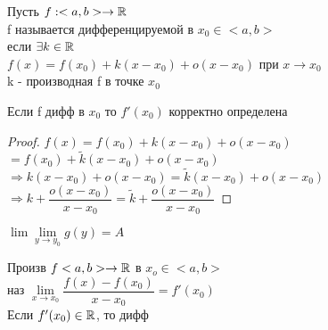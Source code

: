 
\begin{definition}
	Пусть $ f : <a, b> \rightarrow \mathbb{R} $ \\
	f называется дифференцируемой в $ x_0 \in <a, b> $ \\
	если $ \exists k \in \mathbb{R} $ \\
	$ f(x) = f(x_0) + k(x - x_0) + o(x - x_0) $ при $ x \rightarrow x_0 $\\
	k - производная f в точке $ x_0 $
	\begin{lemma}
		Если f дифф в $ x_0 $ то $ f'(x_0) $ корректно определена 
		\begin{proof}
			$ f(x) = f(x_0) + k(x - x_0) + o(x - x_0) $ \\
			$ = f(x_0) + \tilde{k}(x - x_0) + o(x - x_0) $ \\
			$ \Rightarrow k(x-x_0) + o(x-x_0) = \tilde{k} (x -x_0) + o(x-x_0) $\\
			$ \Rightarrow k+\dfrac{o(x-x_0)}{x - x_0} = \tilde{k} + \dfrac{o(x-x_0)}{x-x_0} $ 
		\end{proof}$ \lim\lim\limits_{y \rightarrow y_0} g(y) = A $\\
	\end{lemma}
\end{definition}
\begin{definition}
	Произв $ f<a,b> \rightarrow \mathbb{R} $ в $ x_o \in <a,b> $ \\
	наз $ \lim\limits_{x \rightarrow x_0} \dfrac{f(x) - f(x_0)}{x - x_0} = f'(x_0) $ \\
	Если $ f'(x_0) \in \mathbb{R}$, то дифф 
\end{definition}



